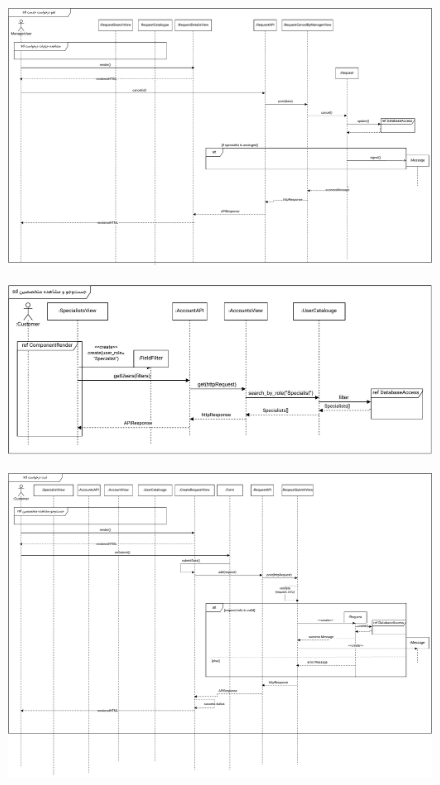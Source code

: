 \eject \pdfpagewidth=14in \pdfpageheight=12in

\begin{figure}[ht!]
	\centering
	\includegraphics[scale=0.8]{figs/design-sequence/3-16.pdf}
\end{figure}
\FloatBarrier
\newpage


\eject \pdfpagewidth=11in \pdfpageheight=5in

\begin{figure}[ht!]
	\centering
	\includegraphics[scale=0.8]{figs/design-sequence/3-17.pdf}
\end{figure}
\FloatBarrier
\newpage

\eject \pdfpagewidth=15in \pdfpageheight=12in

\begin{figure}[ht!]
	\centering
	\includegraphics[scale=0.8]{figs/design-sequence/3-18.pdf}
\end{figure}
\FloatBarrier
\newpage

